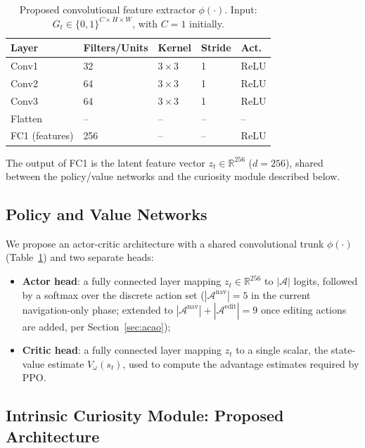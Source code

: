\documentclass[sigconf,nonacm,language=english]{acmart}
\begin{document}
\begin{table}
  \caption{Proposed convolutional feature extractor $\phi(\cdot)$. Input:
    $G_t \in \{0,1\}^{C \times H \times W}$, with $C=1$ initially.}
  \label{tab:cnn-arch}
  \begin{tabular}{lllll}
    \toprule
    \textbf{Layer} & \textbf{Filters/Units} & \textbf{Kernel} & \textbf{Stride} & \textbf{Act.} \\
    \midrule
    Conv1 & 32  & $3\times3$ & 1 & ReLU \\
    Conv2 & 64  & $3\times3$ & 1 & ReLU \\
    Conv3 & 64  & $3\times3$ & 1 & ReLU \\
    Flatten & -- & -- & -- & -- \\
    FC1 (features) & 256 & -- & -- & ReLU \\
    \bottomrule
  \end{tabular}
\end{table}

The output of FC1 is the latent feature vector $z_t \in \mathbb{R}^{256}$
($d=256$), shared between the policy/value networks and the curiosity
module described below.

\subsection{Policy and Value Networks}
\label{sec:policy-net}

We propose an actor-critic architecture with a shared convolutional trunk
$\phi(\cdot)$ (Table~\ref{tab:cnn-arch}) and two separate heads:
\begin{itemize}
  \item \textbf{Actor head}: a fully connected layer mapping $z_t \in
    \mathbb{R}^{256}$ to $|\mathcal{A}|$ logits, followed by a softmax over
    the discrete action set ($|\mathcal{A}^{\text{nav}}| = 5$ in the
    current navigation-only phase; extended to $|\mathcal{A}^{\text{nav}}|
    + |\mathcal{A}^{\text{edit}}| = 9$ once editing actions are added, per
    Section~\ref{sec:acao});
  \item \textbf{Critic head}: a fully connected layer mapping $z_t$ to a
    single scalar, the state-value estimate $V_\omega(s_t)$, used to
    compute the advantage estimates required by PPO.
\end{itemize}

\subsection{Intrinsic Curiosity Module: Proposed Architecture}
\label{sec:icm-arch}
\end{document}
